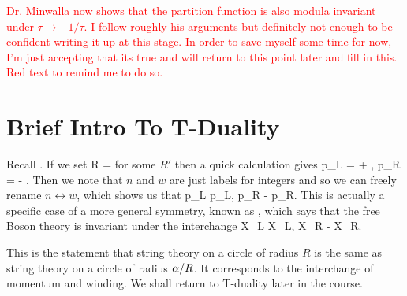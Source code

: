 \textcolor{red}{Dr. Minwalla now shows that the partition function is also modula invariant under $\tau\to -1/\tau$. I follow roughly his arguments but definitely not enough to be confident writing it up at this stage. In order to save myself some time for now, I'm just accepting that its true and will return to this point later and fill in this. Red text to remind me to do so. }

\section{Brief Intro To T-Duality}

Recall . If we set
\bse 
    R = 
\ese 
for some $R'$ then a quick calculation gives 
\bse 
    p_L =  + , \qand p_R =  - .
\ese 
Then we note that $n$ and $w$ are just labels for integers and so we can freely rename $n \leftrightarrow w$, which shows us that 
\bse 
    p_L \to p_L, \qand p_R \to - p_R.
\ese 
This is actually a specific case of a more general symmetry, known as , which says that the free Boson theory is invariant under the interchange 
\bse 
    X_L \to X_L, \qand X_R \to - X_R.
\ese 

This is the statement that string theory on a circle of radius $R$ is the same as string theory on a circle of radius $\alpha/R$. It corresponds to the interchange of momentum and winding. We shall return to T-duality later in the course.